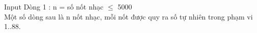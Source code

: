 Input
Dòng 1 : n = số nốt nhạc  $\le$  5000   
\\   Một số dòng sau là n nốt nhạc, mỗi nốt được quy ra số tự nhiên trong phạm vi 1..88.   
\\